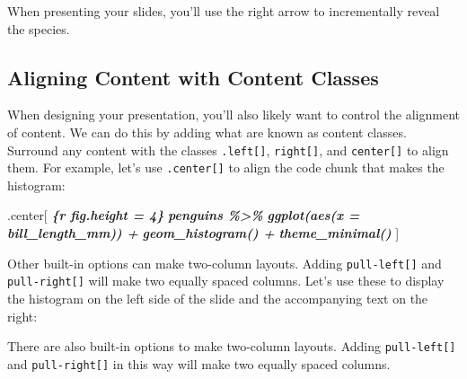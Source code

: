 \documentclass[
]{book}
\newenvironment{Shaded}{\begin{snugshade}}{\end{snugshade}}
\newcommand{\InformationTok}[1]{\textcolor[rgb]{0.56,0.35,0.01}{\textbf{\textit{#1}}}}
\newcommand{\NormalTok}[1]{#1}
\begin{document}
When presenting your slides, you'll use the right arrow to incrementally reveal the species.

\hypertarget{aligning-content-with-content-classes}{%
\subsection*{Aligning Content with Content Classes}\label{aligning-content-with-content-classes}}

When designing your presentation, you'll also likely want to control the alignment of content. We can do this by adding what are known as content classes. Surround any content with the classes \texttt{.left{[}{]}}, \texttt{right{[}{]}}, and \texttt{center{[}{]}} to align them. For example, let's use \texttt{.center{[}{]}} to align the code chunk that makes the histogram:

\begin{Shaded}
\begin{Highlighting}[]
\NormalTok{.center[}
\InformationTok{\textasciigrave{}\textasciigrave{}\textasciigrave{}\{r fig.height = 4\}}
\InformationTok{penguins \%\textgreater{}\% }
\InformationTok{  ggplot(aes(x = bill\_length\_mm)) +}
\InformationTok{  geom\_histogram() +}
\InformationTok{  theme\_minimal()}
\InformationTok{\textasciigrave{}\textasciigrave{}\textasciigrave{}}
\NormalTok{]}
\end{Highlighting}
\end{Shaded}

Other built-in options can make two-column layouts. Adding \texttt{pull-left{[}{]}} and \texttt{pull-right{[}{]}} will make two equally spaced columns. Let's use these to display the histogram on the left side of the slide and the accompanying text on the right:

There are also built-in options to make two-column layouts. Adding \texttt{pull-left{[}{]}} and \texttt{pull-right{[}{]}} in this way will make two equally spaced columns.
\end{document}
